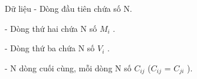 Dữ liệu
- Dòng đầu tiên chứa số N.   


   - Dòng thứ hai chứa N số $M_{i}$   .   


   - Dòng thứ ba chứa N số $V_{i}$   .   


   - N dòng cuối cùng, mỗi dòng N số $C_{ij}$   ($C_{ij}$   = $C_{ji}$   ).